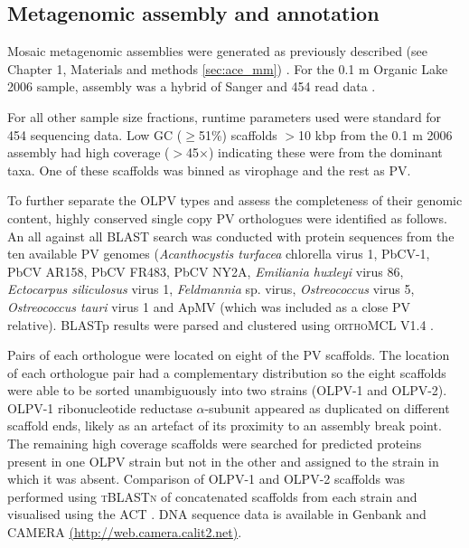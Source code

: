 \subsection{Metagenomic assembly and annotation}
Mosaic metagenomic assemblies were generated as previously described (see Chapter 1, Materials and methods \ref{sec:ace_mm}) \cite{Ng2010a, Lauro2011}. 
For the 0.1 \textmu{}m Organic Lake 2006 sample, assembly was a hybrid of Sanger and 454 read data . 

For all other sample size fractions, runtime parameters used were standard for 454 sequencing data. 
Low GC ($\ge$51\%) scaffolds $>$10 kbp from the 0.1 \textmu{}m 2006 assembly had high coverage ($>$45$\times$) indicating these were from the dominant taxa. 
One of these scaffolds was binned as virophage and the rest as \ac{PV}. 

To further separate the \ac{OLPV} types and assess the completeness of their genomic content, highly conserved single copy PV orthologues were identified as follows. 
An all against all \ac{BLAST} search was conducted with protein sequences from the ten available \ac{PV} genomes 
(\emph{Acanthocystis turfacea} chlorella virus 1, PbCV-1, PbCV AR158, PbCV FR483, PbCV NY2A, \emph{Emiliania huxleyi} virus 86, \emph{Ectocarpus siliculosus} virus 1, \emph{Feldmannia} sp. virus, \emph{Ostreococcus} virus 5, \emph{Ostreococcus tauri} virus 1 and \ac{ApMV} (which was included as a close \ac{PV} relative). 
\ac{BLAST}p results were parsed and clustered using \textsc{orthoMCL} V1.4 \cite{Li2003, Chen2006}. 

Pairs of each orthologue were located on eight of the \ac{PV} scaffolds. 
The location of each orthologue pair had a complementary distribution so the eight scaffolds were able to be sorted unambiguously into two strains (\ac{OLPV}-1 and \ac{OLPV}-2). 
\ac{OLPV}-1 ribonucleotide reductase $\alpha$-subunit appeared as duplicated on different scaffold ends, likely as an artefact of its proximity to an assembly break point. 
The remaining high coverage scaffolds were searched for predicted proteins present in one \ac{OLPV} strain but not in the other and assigned to the strain in which it was absent. 
Comparison of \ac{OLPV}-1 and \ac{OLPV}-2 scaffolds was performed using \textsc{tBLASTn} of concatenated scaffolds from each strain and visualised using the \ac{ACT} \cite{Carver2005}. 
\textsc{DNA} sequence data is available in Genbank and \ac{CAMERA} \url{(http://web.camera.calit2.net)}.

